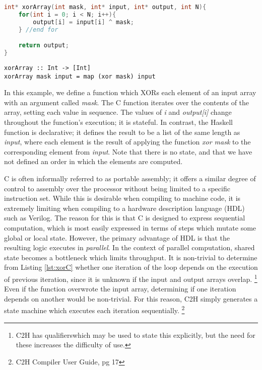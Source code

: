 \documentclass[english,onecolumn]{article}
\begin{document}
\begin{lstlisting}[language=C, caption={XORing an array in C.}, label={lst:xorC}]
int* xorArray(int mask, int* input, int* output, int N){
    for(int i = 0; i < N; i++){
        output[i] = input[i] ^ mask;
    } //end for

    return output;
}
\end{lstlisting}

\begin{lstlisting}[caption={XORing an array in Haskell.}, label={lst:xorH}]
xorArray :: Int -> [Int]
xorArray mask input = map (xor mask) input
\end{lstlisting}

In this example, we define a function which XORs each element of an input array with an argument called \textit{mask}. The C function iterates over the contents of the array, setting each value in sequence. The values of \textit{i} and \textit{output[i]} change throughout the function's execution; it is stateful. In contrast, the Haskell function is declarative; it defines the result to be a list of the same length as \textit{input}, where each element is the result of applying the function \textit{xor mask} to the corresponding element from \textit{input}. Note that there is no state, and that we have not defined an order in which the elements are computed.

C is often informally referred to as portable assembly; it offers a similar degree of control to assembly over the processor without being limited to a specific instruction set. While this is desirable when compiling to machine code, it is extremely limiting when compiling to a hardware description language (HDL) such as Verilog.
The reason for this is that C is designed to express sequential computation, which is most easily expressed in terms of steps which mutate some global or local state. However, the primary advantage of HDL is that the resulting logic executes in \textit{parallel}. In the context of parallel computation, shared state becomes a bottleneck which limits throughput.
It is non-trivial to determine from Listing \ref{lst:xorC} whether one iteration of the loop depends on the execution of previous iteration, since it is unknown if the input and output arrays overlap.%
\footnote{C2H has qualifiers\footnotemark which may be used to state this explicitly, but the need for these increases the difficulty of use.}
Even if the function overwrote the input array, determining if one iteration depends on another would be non-trivial. For this reason, C2H simply generates a state machine which executes each iteration sequentially.%
\footnote{C2H Compiler User Guide, pg 17}
\end{document}

